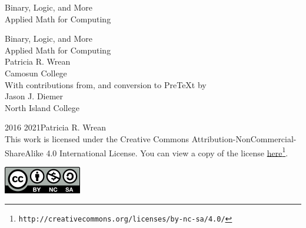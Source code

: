 \documentclass[twoside,10pt,]{book}
\newcommand{\titlepagefont}{\relax}
\numberwithin{equation}{section}
\begin{document}
\raggedbottom
\frontmatter
\thispagestyle{empty}
{\titlepagefont\centering
\vspace*{0.28\textheight}
{\Huge Binary, Logic, and More}\\[2\baselineskip]
{\LARGE Applied Math for Computing}\\
}
\clearpage
\thispagestyle{empty}
\null%
\clearpage
\thispagestyle{empty}
{\titlepagefont\centering
\vspace*{0.14\textheight}
{\Huge Binary, Logic, and More}\\[\baselineskip]
{\LARGE Applied Math for Computing}\\[3\baselineskip]
{\Large Patricia R. Wrean}\\[0.5\baselineskip]
{\Large Camosun College}\\[3\baselineskip]
{\Large With contributions from, and conversion to PreTeXt by}\\[0.5\baselineskip]
{\normalsize Jason J. Diemer}\\[0.25\baselineskip]
North Island College\\
}
\clearpage
\thispagestyle{empty}
\label{g:colophon:idp225740008}{}\hypertarget{g:colophon:idp225740008}{}
\noindent\textcopyright{}2016 \textendash{} 2021\quad{}Patricia R. Wrean\\[0.5\baselineskip]
This work is licensed under the Creative Commons Attribution-NonCommercial-ShareAlike 4.0 International License. You can view a copy of the license \href{http://creativecommons.org/licenses/by-nc-sa/4.0/}{here}\footnote{\nolinkurl{http://creativecommons.org/licenses/by-nc-sa/4.0/}\label{g:fn:idp225752168}}. \begin{image}{0.375}{0.25}{0.375}%
\includegraphics[width=\linewidth]{external/images/by-nc-sa.png}
\end{image}%
\end{document}
